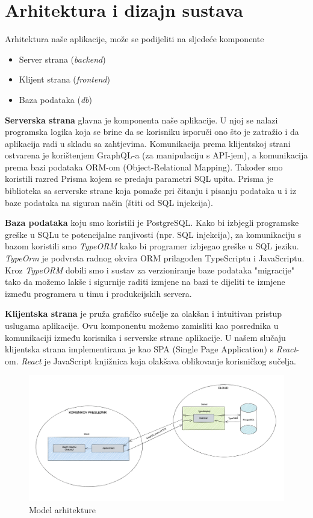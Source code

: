 \chapter{Arhitektura i dizajn sustava}
		Arhitektura naše aplikacije, može se podijeliti na sljedeće komponente
	\begin{itemize}
		\item 	Server strana (\textit{backend})
		\item 	Klijent strana (\textit{frontend})
		\item 	Baza podataka (\textit{db})		
	\end{itemize}
	\textbf{Serverska strana} glavna je komponenta naše aplikacije. U njoj se nalazi programska logika koja se brine da se korisniku isporuči ono što je zatražio i da aplikacija radi u skladu sa zahtjevima. Komunikacija prema klijentskoj strani ostvarena je korištenjem GraphQL-a (za manipulaciju s API-jem), a komunikacija prema bazi podataka ORM-om (Object-Relational Mapping). Također smo koristili razred Prisma kojem se predaju parametri SQL upita. Prisma je biblioteka sa serverske strane koja pomaže pri čitanju i pisanju podataka u i iz baze podataka na siguran način (štiti od SQL injekcija).
	
	\textbf{Baza podataka} koju smo koristili je PostgreSQL. Kako bi izbjegli programske greške u SQLu te potencijalne ranjivosti (npr. SQL injekcija), za komunikaciju s bazom koristili smo \textit{TypeORM} kako bi programer izbjegao greške u SQL jeziku. \textit{TypeOrm} je podvrsta radnog okvira ORM prilagođen TypeScriptu i JavaScriptu. Kroz \textit{TypeORM} dobili smo i sustav za verzioniranje baze podataka "migracije" tako da možemo lakše i sigurnije raditi izmjene na bazi te dijeliti te izmjene između programera u timu i produkcijskih servera. 
	
	\textbf{Klijentska strana} je pruža grafičko sučelje za olakšan i intuitivan pristup uslugama aplikacije. Ovu komponentu možemo zamisliti kao posrednika u komunikaciji između korisnika i serverske strane aplikacije. U našem slučaju klijentska strana implementirana je kao SPA (Single Page Application) s \textit{React}-om. \textit{React} je JavaScript knjižnica koja olakšava oblikovanje korisničkog sučelja.\\
	
	\begin{figure}[H]
		\includegraphics[width=\textwidth]{slike/arhitekturaDijagram.png} 
		\caption{Model arhitekture}
		\label{fig:arhitektura} 
	\end{figure}

